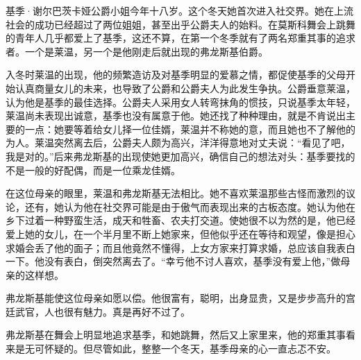 \par 基季·谢尔巴茨卡娅公爵小姐今年十八岁。这个冬天她首次进入社交界。她在上流社会的成功已经超过了两位姐姐，甚至出乎公爵夫人的始料。在莫斯科舞会上跳舞的青年人几乎都爱上了基季，这还不算，在第一个冬季就有了两名郑重其事的追求者。一个是莱温，另一个是他刚走后就出现的弗龙斯基伯爵。
\par 入冬时莱温的出现，他的频繁造访及对基季明显的爱慕之情，都促使基季的父母开始认真商量女儿的未来，也导致了公爵和公爵夫人为此发生争执。公爵垂意莱温，认为他是基季的最佳选择。公爵夫人采用女人转弯抹角的惯技，只说基季太年轻，莱温尚未表现出诚意，基季也没有属意于他。她还找了种种理由，就是不肯说出主要的一点：她要等着给女儿择一位佳婿，莱温并不称她的意，而且她也不了解他的为人。莱温突然离去后，公爵夫人颇为高兴，洋洋得意地对丈夫说：“看见了吧，我是对的。”后来弗龙斯基的出现使她更加高兴，确信自己的想法对头：基季要找的不是一般的好配偶，而是一位乘龙佳婿。
\par 在这位母亲的眼里，莱温和弗龙斯基无法相比。她不喜欢莱温那些古怪而激烈的议论，还有，她认为他在社交界可能是由于傲气而表现出来的古板态度。她认为他在乡下过着一种野蛮生活，成天和牲畜、农夫打交道。使她很不以为然的是，他已经爱上她的女儿，在一个半月里不断上她家来，但他似乎还在等待和观望，像是担心求婚会丢了他的面子；而且他竟然不懂得，上女方家来打算求婚，总应该自我表白一下。他没有表白，倒突然离去了。“幸亏他不讨人喜欢，基季没有爱上他，”做母亲的这样想。
\par 弗龙斯基能使这位母亲如愿以偿。他很富有，聪明，出身显贵，又是步步高升的宫廷武官，人也很有魅力。真是再好不过了。
\par 弗龙斯基在舞会上明显地追求基季，和她跳舞，然后又上家里来，他的郑重其事看来是无可怀疑的。但尽管如此，整整一个冬天，基季母亲的心一直忐忑不安。
